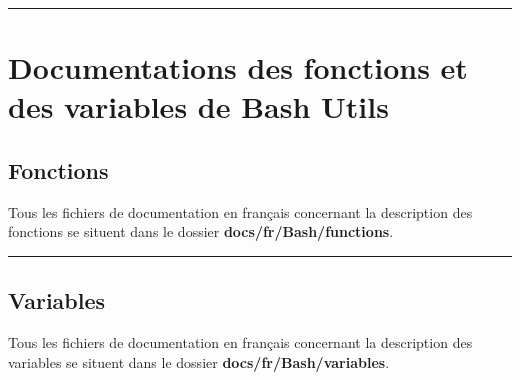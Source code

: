 \documentclass[a4paper,10pt]{article}
\begin{document}



\color{red}\par\noindent\rule{\textwidth}{0.4pt}\color{white}

\color{red}
\section{Documentations des fonctions et des variables de Bash Utils}\color{white}

\color{green}
\subsection{Fonctions}\color{white}

\begin{justify}
    Tous les fichiers de documentation en français concernant la description des fonctions se situent dans le dossier \textbf{\color{lime}docs/fr/Bash/functions}.
\end{justify}




\color{green}\par\noindent\rule{\textwidth}{0.4pt}\color{white}

\color{green}
\subsection{Variables}\color{white}

\begin{justify}
    Tous les fichiers de documentation en français concernant la description des variables se situent dans le dossier \textbf{\color{lime}docs/fr/Bash/variables}.
\end{justify}
\end{document}
